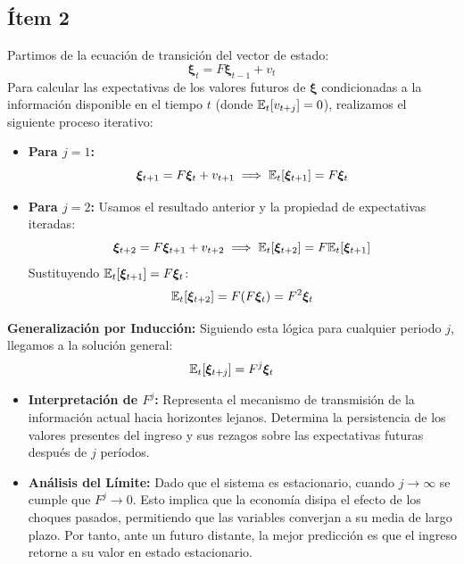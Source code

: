 \subsection*{Ítem 2 }

Partimos de la ecuación de transición del vector de estado:
\begin{equation}
    \bm{\xi}_t = F \bm{\xi}_{t-1} + v_t
\end{equation}
Para calcular las expectativas de los valores futuros de $\bm{\xi}$ condicionadas a la información disponible en el tiempo $t$ (donde $\mathbb{E}_t[v_{t+j}] = 0$), realizamos el siguiente proceso iterativo:

\begin{itemize}
    \item \textbf{Para $j=1$:}
    \begin{equation}
        \bm{\xi}_{t+1} = F \bm{\xi}_t + v_{t+1} \implies \mathbb{E}_t[\bm{\xi}_{t+1}] = F \bm{\xi}_t
    \end{equation}
    
    \item \textbf{Para $j=2$:}
    Usamos el resultado anterior y la propiedad de expectativas iteradas:
    \begin{equation}
        \bm{\xi}_{t+2} = F \bm{\xi}_{t+1} + v_{t+2} \implies \mathbb{E}_t[\bm{\xi}_{t+2}] = F \mathbb{E}_t[\bm{\xi}_{t+1}]
    \end{equation}
    Sustituyendo $\mathbb{E}_t[\bm{\xi}_{t+1}] = F \bm{\xi}_t$:
    \begin{equation}
        \mathbb{E}_t[\bm{\xi}_{t+2}] = F(F \bm{\xi}_t) = F^2 \bm{\xi}_t
    \end{equation}
\end{itemize}

\textbf{Generalización por Inducción:}
Siguiendo esta lógica para cualquier periodo $j$, llegamos a la solución general:
\begin{equation}
    \mathbb{E}_t[\bm{\xi}_{t+j}] = F^j \bm{\xi}_t
\end{equation}

\begin{itemize}
    \item \textbf{Interpretación de $F^j$:} Representa el mecanismo de transmisión de la información actual hacia horizontes lejanos. Determina la persistencia de los valores presentes del ingreso y sus rezagos sobre las expectativas futuras después de $j$ períodos.
    
    \item \textbf{Análisis del Límite:} Dado que el sistema es estacionario, cuando $j \to \infty$ se cumple que $F^j \to 0$. Esto implica que la economía disipa el efecto de los choques pasados, permitiendo que las variables converjan a su media de largo plazo. Por tanto, ante un futuro distante, la mejor predicción es que el ingreso retorne a su valor en estado estacionario.
\end{itemize}


